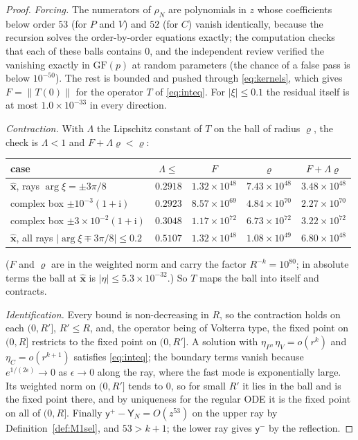 \documentclass{amsart}
\numberwithin{equation}{section}
\theoremstyle{plain}
\theoremstyle{definition}
\theoremstyle{remark}
\newcommand{\hx}{\hat{\mathbf{x}}}
\newcommand{\iu}{\mathrm{i}}
\begin{document}
\begin{proof}
\emph{Forcing.} The numerators of $\rho_N$ are polynomials in $z$ whose coefficients below order $53$ (for $P$ and $V$) and
$52$ (for $C$) vanish identically, because the recursion solves the order-by-order equations exactly; the computation
checks that each of these balls contains $0$, and the independent review verified the vanishing exactly in
$\mathrm{GF}(p)$ at random parameters (the chance of a false pass is below $10^{-50}$). The rest is
bounded and pushed through \eqref{eq:kernels}, which gives $F = \|T(0)\|$ for the operator $T$ of \eqref{eq:inteq}. For
$|\xi| \le 0.1$ the residual itself is at most $1.0\times10^{-33}$ in every direction.

\emph{Contraction.} With $\Lambda$ the Lipschitz constant of $T$ on the ball of radius $\varrho$, the check is $\Lambda < 1$ and
$F + \Lambda\varrho < \varrho$:
\begin{center}\footnotesize
\begin{tabular}{lcccc}
\toprule
case & $\Lambda \le$ & $F$ & $\varrho$ & $F + \Lambda\varrho$ \\
\midrule
$\hx$, rays $\arg\xi = \pm3\pi/8$ & $0.2918$ & $1.32\times10^{48}$ & $7.43\times10^{48}$ & $3.48\times10^{48}$ \\
complex box $\pm10^{-3}(1+\iu)$ & $0.2923$ & $8.57\times10^{69}$ & $4.84\times10^{70}$ & $2.27\times10^{70}$ \\
complex box $\pm3\times10^{-2}(1+\iu)$ & $0.3048$ & $1.17\times10^{72}$ & $6.73\times10^{72}$ & $3.22\times10^{72}$ \\
$\hx$, all rays $|\arg\xi \mp 3\pi/8| \le 0.2$ & $0.5107$ & $1.32\times10^{48}$ & $1.08\times10^{49}$ & $6.80\times10^{48}$ \\
\bottomrule
\end{tabular}
\end{center}
($F$ and $\varrho$ are in the weighted norm and carry the factor $R^{-k} = 10^{80}$; in absolute terms the ball at $\hx$ is
$|\eta| \le 5.3\times10^{-32}$.) So $T$ maps the ball into itself and contracts.

\emph{Identification.} Every bound is non-decreasing in $R$, so the contraction holds on each $(0, R']$, $R' \le R$, and,
the operator being of Volterra type, the fixed point on $(0, R]$ restricts to the fixed point on $(0, R']$. A solution with
$\eta_P, \eta_V = o(r^k)$ and $\eta_C = o(r^{k+1})$ satisfies \eqref{eq:inteq}; the boundary terms vanish because
$e^{1/(2\epsilon)} \to 0$ as $\epsilon \to 0$ along the ray, where the fast mode is exponentially large. Its weighted norm on
$(0, R']$ tends to $0$, so for small $R'$ it lies in the ball and is the fixed point there, and by uniqueness for the regular
ODE it is the fixed point on all of $(0, R]$. Finally $\mathsf y^+ - \mathsf Y_N = O(z^{53})$ on the upper ray by
Definition~\ref{def:M1sel}, and $53 > k + 1$; the lower ray gives $\mathsf y^-$ by the reflection.
\end{proof}
\end{document}
